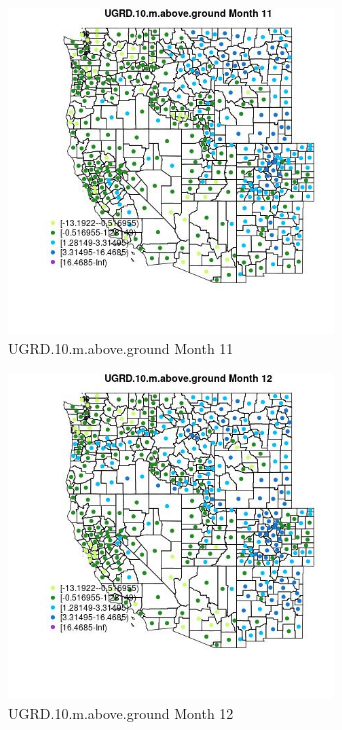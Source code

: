 \begin{figure} 
\centering  
\includegraphics[width=0.77\textwidth]{Code_Outputs/df_report_ML_predictors_CountyCentroid_Locations_Dates_2008-01-01to2018-12-31_MapObsMo11UGRD10maboveground.jpg} 
\caption{\label{fig:df_report_ML_predictors_CountyCentroid_Locations_Dates_2008-01-01to2018-12-31MapObsMo11UGRD10maboveground}UGRD.10.m.above.ground Month 11} 
\end{figure} 
 

\begin{figure} 
\centering  
\includegraphics[width=0.77\textwidth]{Code_Outputs/df_report_ML_predictors_CountyCentroid_Locations_Dates_2008-01-01to2018-12-31_MapObsMo12UGRD10maboveground.jpg} 
\caption{\label{fig:df_report_ML_predictors_CountyCentroid_Locations_Dates_2008-01-01to2018-12-31MapObsMo12UGRD10maboveground}UGRD.10.m.above.ground Month 12} 
\end{figure} 
 

